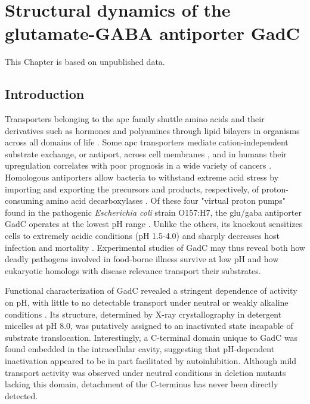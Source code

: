 \clearpage %

\chapter{Structural dynamics of the glutamate-GABA antiporter GadC}\label{ch:gadc}

This Chapter is based on unpublished data.

\section{Introduction}

Transporters belonging to the \gls{apc} family shuttle amino acids and their derivatives such as hormones and polyamines through lipid bilayers in organisms across all domains of life \citep*{Kandasamy2018, Vastermark2014}. Some \gls{apc} transporters mediate cation-independent substrate exchange, or antiport, across cell membranes \citep*{Bartoccioni2019, Errasti-Murugarren2019, Shaffer2009}, and in humans their upregulation correlates with poor prognosis in a wide variety of cancers \citep*{Kandasamy2018}.  Homologous antiporters allow bacteria to withstand extreme acid stress by importing and exporting the precursors and products, respectively, of proton-consuming amino acid decarboxylases \citep*{Foster2004, Hersh1996, Kanjee2013}. Of these four "virtual proton pumps" found in the pathogenic \emph{Escherichia coli} strain O157:H7, the \gls{glu}/\gls{gaba} antiporter GadC operates at the lowest pH range \citep*{Gao2010, Kanjee2013, Ma2012}. Unlike the others, its knockout sensitizes cells to extremely acidic conditions (pH 1.5-4.0) and sharply decreases host infection and mortality \citep*{Lu2013}. Experimental studies of GadC may thus reveal both how deadly pathogens involved in food-borne illness survive at low pH and how eukaryotic homologs with disease relevance transport their substrates.

Functional characterization of GadC revealed a stringent dependence of activity on pH, with little to no detectable transport under neutral or weakly alkaline conditions \citep*{Ma2013, Ma2012, Tsai2013}. Its structure, determined by X-ray crystallography in detergent micelles at pH 8.0, was putatively assigned to an inactivated state incapable of substrate translocation. Interestingly, a C-terminal domain unique to GadC was found embedded in the intracellular cavity, suggesting that pH-dependent inactivation appeared to be in part facilitated by autoinhibition. Although mild transport activity was observed under neutral conditions in deletion mutants lacking this domain, detachment of the C-terminus has never been directly detected.

